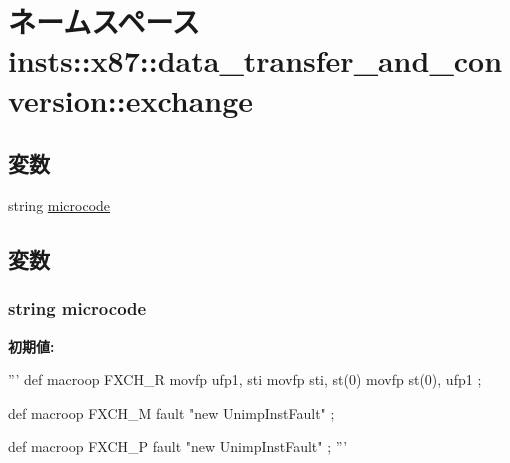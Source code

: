 \hypertarget{namespaceinsts_1_1x87_1_1data__transfer__and__conversion_1_1exchange}{
\section{ネームスペース insts::x87::data\_\-transfer\_\-and\_\-conversion::exchange}
\label{namespaceinsts_1_1x87_1_1data__transfer__and__conversion_1_1exchange}
}
\subsection*{変数}
\begin{DoxyCompactItemize}
\item 
string \hyperlink{namespaceinsts_1_1x87_1_1data__transfer__and__conversion_1_1exchange_a770f11a173e99389a8802f0107ed8f52}{microcode}
\end{DoxyCompactItemize}


\subsection{変数}
\hypertarget{namespaceinsts_1_1x87_1_1data__transfer__and__conversion_1_1exchange_a770f11a173e99389a8802f0107ed8f52}{
\subsubsection[{microcode}]{\setlength{\rightskip}{0pt plus 5cm}string {\bf microcode}}}
\label{namespaceinsts_1_1x87_1_1data__transfer__and__conversion_1_1exchange_a770f11a173e99389a8802f0107ed8f52}
{\bfseries 初期値:}
\begin{DoxyCode}
'''
def macroop FXCH_R
{
    movfp ufp1, sti
    movfp sti, st(0)
    movfp st(0), ufp1
};

def macroop FXCH_M
{
    fault "new UnimpInstFault"
};

def macroop FXCH_P
{
   fault "new UnimpInstFault"
};
'''
\end{DoxyCode}
